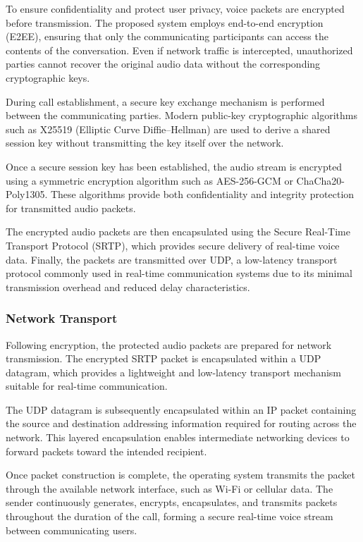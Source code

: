 To ensure confidentiality and protect user privacy, voice packets are encrypted before transmission. The proposed system employs end-to-end encryption (E2EE), ensuring that only the communicating participants can access the contents of the conversation. Even if network traffic is intercepted, unauthorized parties cannot recover the original audio data without the corresponding cryptographic keys.

During call establishment, a secure key exchange mechanism is performed between the communicating parties. Modern public-key cryptographic algorithms such as X25519 (Elliptic Curve Diffie–Hellman) are used to derive a shared session key without transmitting the key itself over the network. 

Once a secure session key has been established, the audio stream is encrypted using a symmetric encryption algorithm such as AES-256-GCM or ChaCha20-Poly1305. These algorithms provide both confidentiality and integrity protection for transmitted audio packets.

The encrypted audio packets are then encapsulated using the Secure Real-Time Transport Protocol (SRTP), which provides secure delivery of real-time voice data. Finally, the packets are transmitted over UDP, a low-latency transport protocol commonly used in real-time communication systems due to its minimal transmission overhead and reduced delay characteristics.

\subsubsection{Network Transport}

Following encryption, the protected audio packets are prepared for network transmission. The encrypted SRTP packet is encapsulated within a UDP datagram, which provides a lightweight and low-latency transport mechanism suitable for real-time communication.

The UDP datagram is subsequently encapsulated within an IP packet containing the source and destination addressing information required for routing across the network. This layered encapsulation enables intermediate networking devices to forward packets toward the intended recipient.

Once packet construction is complete, the operating system transmits the packet through the available network interface, such as Wi-Fi or cellular data. The sender continuously generates, encrypts, encapsulates, and transmits packets throughout the duration of the call, forming a secure real-time voice stream between communicating users.